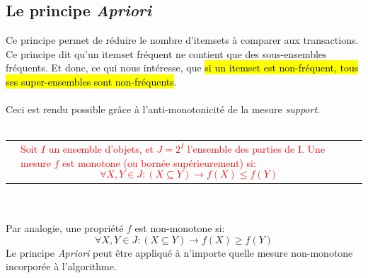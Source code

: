 \documentclass[letterpaper, 12pt]{article}
\newcommand{\alinea}{
\hspace*{0.5cm}}
\newcommand{\red}[1]{
	\textcolor{red}{#1}}
\newcommand{\myul}[1]{
		\underline{\smash{#1}}
	}
\begin{document}
		\subsection{Le principe \textit{Apriori}}\label{sec:rules:apriori}
			\alinea Ce principe permet de réduire le nombre d'itemsets à
				comparer aux transactions. Ce principe dit qu'un itemset
				fréquent ne contient que des sous-ensembles fréquents.
				Et donc, ce qui nous intéresse, que\hl{ si un itemset est 
				non-fréquent, tous ses super-ensembles sont non-fréquents}.\\
			~\\
			\alinea Ceci est rendu possible grâce à l'anti-monotonicité
				de la mesure \textit{support}.\\~\\
			\begin{tabular}{lp{10cm}}
				\myul{\textbf{Propriété de Monotonicité}} &
					\red{Soit $I$ un ensemble d'objets, et $J = 2^I$ l'ensemble 
					des parties de I. Une mesure $f$ est monotone
					(ou bornée supérieurement) si:
					$$ \forall X, Y \in J : (X \subseteq Y) 
							\longrightarrow f(X) \leq f(Y) $$}		
			\end{tabular}~\\~\\
			Par analogie, une propriété $f$ est non-monotone si:
				$$ \forall X, Y \in J : (X \subseteq Y) 
							\longrightarrow f(X) \geq f(Y) $$
			Le principe \textit{Apriori} peut être appliqué à n'importe 
			quelle mesure non-monotone incorporée à l'algorithme.
\end{document}
